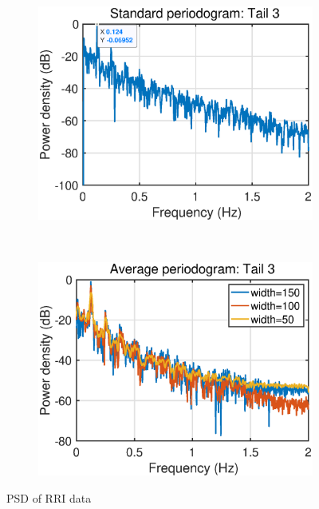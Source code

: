 \begin{figure}[htb]
\begin{subfigure}{0.4\textwidth}
         \includegraphics[width=\textwidth]{fig/15/15a5.eps}
     \end{subfigure}
     ~
     \begin{subfigure}{0.4\textwidth}
         \centering
         \includegraphics[width=\textwidth]{fig/15/15a6.eps}
     \end{subfigure}
        \caption{PSD of RRI data}
        \label{fig:1_5_a}
\end{figure}
